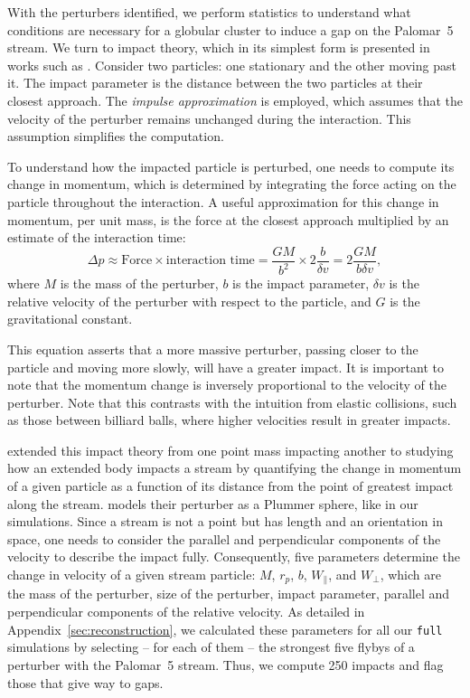 \documentclass{aa}
\begin{document}
    With the perturbers identified, we perform statistics to understand what conditions are necessary for a globular cluster to induce a gap on the Palomar~5 stream. We turn to impact theory, which in its simplest form is presented in works such as \citet{2008gady.book.....B}. Consider two particles: one stationary and the other moving past it. The impact parameter is the distance between the two particles at their closest approach. The \textit{impulse approximation} is employed, which assumes that the velocity of the perturber remains unchanged during the interaction. This assumption simplifies the computation.

    To understand how the impacted particle is perturbed, one needs to compute its change in momentum, which is determined by integrating the force acting on the particle throughout the interaction. A useful approximation for this change in momentum, per unit mass, is the force at the closest approach multiplied by an estimate of the interaction time:
    \begin{equation} \label{eq:change_in_momentum} \Delta p \approx \text{Force} \times \text{interaction time} = \frac{GM}{b^2} \times 2\frac{b}{\delta v} = 2\frac{GM}{b \delta v}, \end{equation}where $M$ is the mass of the perturber, $b$ is the impact parameter, $\delta v$ is the relative velocity of the perturber with respect to the particle, and $G$ is the gravitational constant. 


    This equation asserts that a more massive perturber, passing closer to the particle and moving more slowly, will have a greater impact. It is important to note that the momentum change is inversely proportional to the velocity of the perturber. Note that this contrasts with the intuition from elastic collisions, such as those between billiard balls, where higher velocities result in greater impacts.

    \citet{2015MNRAS.450.1136E} extended this impact theory from one point mass impacting another to studying how an extended body impacts a stream by quantifying the change in momentum of a given particle as a function of its distance from the point of greatest impact along the stream. \citet{2015MNRAS.450.1136E} models their perturber as a Plummer sphere, like in our simulations. Since a stream is not a point but has length and an orientation in space, one needs to consider the parallel and perpendicular components of the velocity to describe the impact fully. Consequently, five parameters determine the change in velocity of a given stream particle: $M$, $r_p$, $b$, $W_\parallel$, and $W_\perp$, which are the mass of the perturber, size of the perturber, impact parameter, parallel and perpendicular components of the relative velocity. As detailed in Appendix~\ref{sec:reconstruction}, we calculated these parameters for all our \texttt{full} simulations by selecting -- for each of them --  the strongest five flybys of a perturber with the Palomar~5 stream. Thus, we compute 250 impacts and flag those that give way to gaps. 
\end{document}
